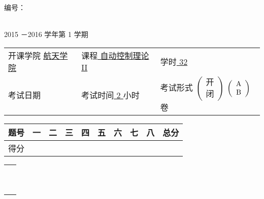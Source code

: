 \documentclass[12pt,oneside]{article}
\begin{document}
\noindent 编号：\underline {\hspace{4eM}}



\begin{center}
\textbf{ \fontsize{18pt}{\baselineskip}\selectfont{西北工业大学考试试题（卷）}}\\
2015 －2016 学年第 1 学期
\end{center}

{
\flushleft

\begin{tabular}{lll}
开课学院 \underline {\hspace{1em} 航天学院\hspace{1em} }& 课程\underline {\hspace{1em} 自动控制理论II\hspace{1em} }& 学时\underline {\hspace{1em} 32\hspace{1em} }\\
考试日期\underline {\hspace{6eM} }& 考试时间\underline {\hspace{1em} 2\hspace{1em} }小时 & 考试形式
$\left(\begin{array}{c}
\mbox{开}\\
\mbox{闭}
\end{array} \right)$
$\left(\begin{array}{*{10}c}
 \mbox{A} \\
 \mbox{B} 
\end{array} \right)$卷 
\end{tabular}
}

{
\center
\renewcommand{\tabcolsep}{1.2em}
\begin{tabular}{|c|c|c|c|c|c|c|c|c|c|} 
\hline
题号 & 一 & 二 & 三 & 四 & 五 & 六 & 七 & 八 & 总分 \\
\hline
得分 &    &    &    &    &    &    &    &    & \\
\hline 
\end{tabular}
}
\begin{tabular}{c}
\ \\
\ 
\end{tabular}
\newcommand{\onlytest}[1]{#1}
\newcommand{\onlyanswer}[1]{}

\clearpage
\end{document}

